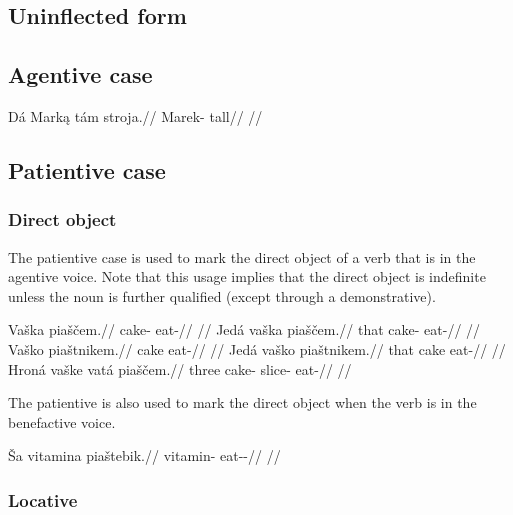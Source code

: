 \subsection{Uninflected form}


\subsection{Agentive case}

\pex
\begingl
\gla Dá Mark\k{a} tám stroja.//
\glb {} Marek-\Agt{} \Comp{} tall//
\glft {}//
\endgl
\xe


\subsection{Patientive case}

\subsubsection{Direct object}
The patientive case is used to mark the direct object of a verb that is in the agentive voice. Note that this usage implies that the direct object is indefinite unless the noun is further qualified (except through a demonstrative).

\pex
\a
\begingl
\gla Vaška piaščem.//
\glb cake-\Acc{} eat-//
\glft {}//
\endgl
\a
\begingl
\gla Jedá vaška piaščem.//
\glb that cake-\Acc{} eat-//
\glft {}//
\endgl
\a
\begingl
\gla Vaško piaštnikem.//
\glb cake eat-//
\glft {}//
\endgl
\a
\begingl
\gla Jedá vaško piaštnikem.//
\glb that cake eat-//
\glft {}//
\endgl
\a
\begingl
\gla Hroná vaške vatá piaščem.//
\glb three cake-\Gen{} slice-\Acc{} eat-//
\glft {}//
\endgl
\xe

The patientive is also used to mark the direct object when the verb is in the benefactive voice.

\pex
\begingl
\gla Ša vitamina piaštebik.//
\glb {} vitamin-\Acc{} eat-\Ben{}-\Pf{}//
\glft {}//
\endgl
\xe



\subsubsection{Locative}

